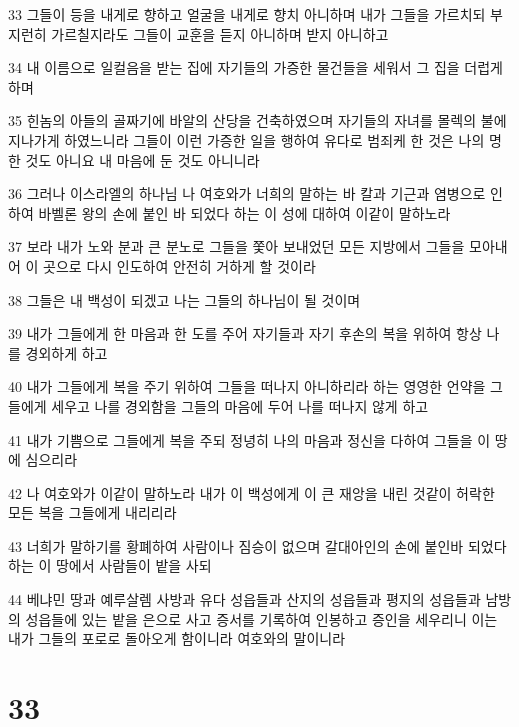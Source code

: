 \par 33 그들이 등을 내게로 향하고 얼굴을 내게로 향치 아니하며 내가 그들을 가르치되 부지런히 가르칠지라도 그들이 교훈을 듣지 아니하며 받지 아니하고
\par 34 내 이름으로 일컬음을 받는 집에 자기들의 가증한 물건들을 세워서 그 집을 더럽게 하며
\par 35 힌놈의 아들의 골짜기에 바알의 산당을 건축하였으며 자기들의 자녀를 몰렉의 불에 지나가게 하였느니라 그들이 이런 가증한 일을 행하여 유다로 범죄케 한 것은 나의 명한 것도 아니요 내 마음에 둔 것도 아니니라
\par 36 그러나 이스라엘의 하나님 나 여호와가 너희의 말하는 바 칼과 기근과 염병으로 인하여 바벨론 왕의 손에 붙인 바 되었다 하는 이 성에 대하여 이같이 말하노라
\par 37 보라 내가 노와 분과 큰 분노로 그들을 쫓아 보내었던 모든 지방에서 그들을 모아내어 이 곳으로 다시 인도하여 안전히 거하게 할 것이라
\par 38 그들은 내 백성이 되겠고 나는 그들의 하나님이 될 것이며
\par 39 내가 그들에게 한 마음과 한 도를 주어 자기들과 자기 후손의 복을 위하여 항상 나를 경외하게 하고
\par 40 내가 그들에게 복을 주기 위하여 그들을 떠나지 아니하리라 하는 영영한 언약을 그들에게 세우고 나를 경외함을 그들의 마음에 두어 나를 떠나지 않게 하고
\par 41 내가 기쁨으로 그들에게 복을 주되 정녕히 나의 마음과 정신을 다하여 그들을 이 땅에 심으리라
\par 42 나 여호와가 이같이 말하노라 내가 이 백성에게 이 큰 재앙을 내린 것같이 허락한 모든 복을 그들에게 내리리라
\par 43 너희가 말하기를 황폐하여 사람이나 짐승이 없으며 갈대아인의 손에 붙인바 되었다 하는 이 땅에서 사람들이 밭을 사되
\par 44 베냐민 땅과 예루살렘 사방과 유다 성읍들과 산지의 성읍들과 평지의 성읍들과 남방의 성읍들에 있는 밭을 은으로 사고 증서를 기록하여 인봉하고 증인을 세우리니 이는 내가 그들의 포로로 돌아오게 함이니라 여호와의 말이니라

\chapter{33}

